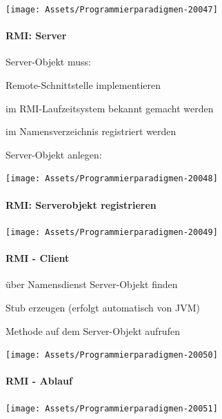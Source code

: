 \documentclass[10pt]{article}
\begin{document}
\begin{center}
  \centering
  \texttt{[image: Assets/Programmierparadigmen-20047]}
\end{center}

\paragraph{RMI: Server}

Server-Objekt muss: 
\begin{itemize*}
  \item Remote-Schnittstelle implementieren
  \item im RMI-Laufzeitsystem bekannt gemacht werden
  \item im Namensverzeichnis registriert werden
\end{itemize*}
Server-Objekt anlegen: 
\begin{center}
  \centering
  \texttt{[image: Assets/Programmierparadigmen-20048]}
\end{center}

\paragraph{RMI: Serverobjekt registrieren}

\begin{center}
  \centering
  \texttt{[image: Assets/Programmierparadigmen-20049]}
\end{center}

\paragraph{RMI - Client}

\begin{itemize*}
  \item über Namensdienst Server-Objekt finden
  \item Stub erzeugen (erfolgt automatisch von JVM)
  \item Methode auf dem Server-Objekt aufrufen
\end{itemize*}
\begin{center}
  \centering
  \texttt{[image: Assets/Programmierparadigmen-20050]}
\end{center}

\paragraph{RMI - Ablauf}

\begin{center}
  \centering
  \texttt{[image: Assets/Programmierparadigmen-20051]}
\end{center}
\end{document}
